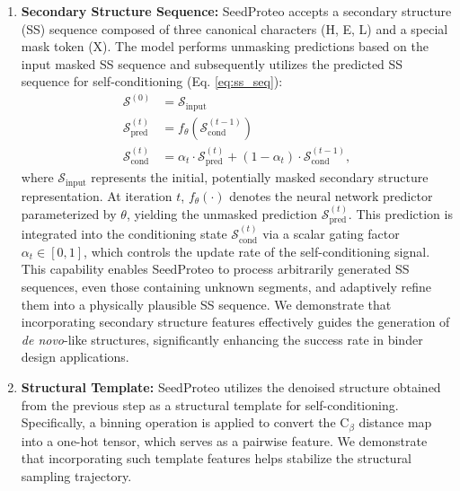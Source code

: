 \begin{enumerate}
    \item \textbf{Secondary Structure Sequence:} SeedProteo accepts a secondary structure (SS) sequence \cite{hekkelman2025dssp} composed of three canonical characters (H, E, L) and a special mask token (X). The model performs unmasking predictions based on the input masked SS sequence and subsequently utilizes the predicted SS sequence for self-conditioning (Eq. \ref{eq:ss_seq}):
\begin{equation}
\label{eq:ss_seq}
\begin{aligned}
    \mathcal{S}^{(0)} &= \mathcal{S}_{\text{input}}  \\
    \mathcal{S}^{(t)}_{\text{pred}} &= f_{\theta}\left(\mathcal{S}^{(t-1)}_{\text{cond}}\right)\\
    \mathcal{S}^{(t)}_{\text{cond}} &= \alpha_t \cdot \mathcal{S}^{(t)}_{\text{pred}} + (1 - \alpha_t) \cdot \mathcal{S}^{(t-1)}_{\text{cond}},
\end{aligned}
\end{equation}
where $\mathcal{S}_{\text{input}}$ represents the initial, potentially masked secondary structure representation. At iteration $t$, $f_{\theta}(\cdot)$ denotes the neural network predictor parameterized by $\theta$, yielding the unmasked prediction $\mathcal{S}^{(t)}_{\text{pred}}$. This prediction is integrated into the conditioning state $\mathcal{S}^{(t)}_{\text{cond}}$ via a scalar gating factor $\alpha_t \in [0, 1]$, which controls the update rate of the self-conditioning signal.
This capability enables SeedProteo to process arbitrarily generated SS sequences, even those containing unknown segments, and adaptively refine them into a physically plausible SS sequence. We demonstrate that incorporating secondary structure features effectively guides the generation of \textit{de novo}-like structures, significantly enhancing the success rate in binder design applications.

    \item \textbf{Structural Template:} SeedProteo utilizes the denoised structure obtained from the previous step as a structural template for self-conditioning. Specifically, a binning operation is applied to convert the C$_\beta$ distance map into a one-hot tensor, which serves as a pairwise feature. We demonstrate that incorporating such template features helps stabilize the structural sampling trajectory.

\end{enumerate}

